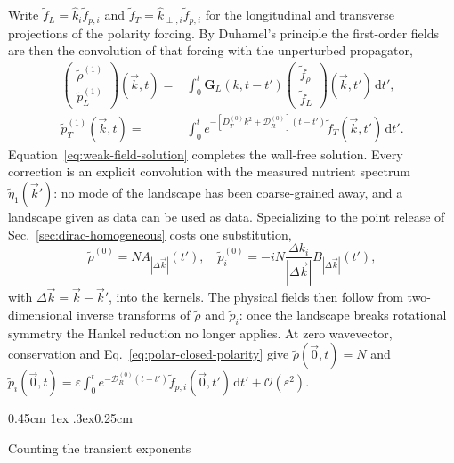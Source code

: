 \documentclass[
  reprint,
  superscriptaddress,
  amsmath,
  amssymb,
  aps,
  pre,
  nofootinbib,
  floatfix
]{revtex4-2}
\makeatletter
\newcommand{\dd}{\mathrm d}
\newcommand{\ord}{\mathcal O}
\newcommand{\DR}{\mathcal D_R^{(0)}}
\def\subsection{\@startsection{subsection}{2}{\z@}%
  {0.45cm \@plus1ex \@minus.3ex}{0.25cm}%
  {\normalfont\small\bfseries\raggedright}}%
\makeatother
\begin{document}
Write $\tilde f_L=\hat k_i\tilde f_{p,i}$ and
$\tilde f_T=\hat k_{\perp,i}\tilde f_{p,i}$ for the longitudinal and
transverse projections of the polarity forcing.  By Duhamel's principle the
first-order fields are then the convolution of that forcing with the
unperturbed propagator,
\begin{subequations}
\label{eq:weak-field-solution}
\begin{align}
 \begin{pmatrix}\tilde\rho^{(1)}\\\tilde p_L^{(1)}\end{pmatrix}(\vec k,t)
 ={}&\int_0^t\mathbf G_L(k,t-t')\begin{pmatrix}\tilde f_\rho\\\tilde f_L\end{pmatrix}(\vec k,t')\,\dd t',
 \label{eq:weak-longitudinal-solution}\\
 \tilde p_T^{(1)}(\vec k,t)
 ={}&\int_0^t e^{-\left[D_T^{(0)}k^2+\DR\right](t-t')}\tilde f_T(\vec k,t')\,\dd t'.
 \label{eq:weak-transverse-solution}
\end{align}
\end{subequations}
Equation~\eqref{eq:weak-field-solution} completes the wall-free solution.  Every correction is an explicit convolution
with the measured nutrient spectrum $\tilde\eta_1(\vec k')$: no mode of the
landscape has been coarse-grained away, and a landscape given as data can be
used as data.  Specializing to the point release of
Sec.~\ref{sec:dirac-homogeneous} costs one substitution,
\begin{equation}
 \tilde\rho^{(0)}=N A_{|\Delta\vec k|}(t'),
 \quad
 \tilde p_i^{(0)}=-iN\frac{\Delta k_i}{|\Delta\vec k|}B_{|\Delta\vec k|}(t'),
 \label{eq:dirac-substitution}
\end{equation}
with $\Delta\vec k=\vec k-\vec k'$, into the kernels.  The
physical fields then follow from two-dimensional inverse transforms of
$\tilde\rho$ and $\tilde p_i$: once the landscape breaks rotational symmetry
the Hankel reduction no longer applies.  At zero wavevector, conservation and
Eq.~\eqref{eq:polar-closed-polarity} give $\tilde\rho(\vec0,t)=N$ and
$\tilde p_i(\vec0,t)=\varepsilon\int_0^te^{-\DR(t-t')}\tilde f_{p,i}(\vec0,t')\,\dd t'+\ord(\varepsilon^2)$.

\subsection{Counting the transient exponents}
\label{sec:transient-hierarchy}
\end{document}
